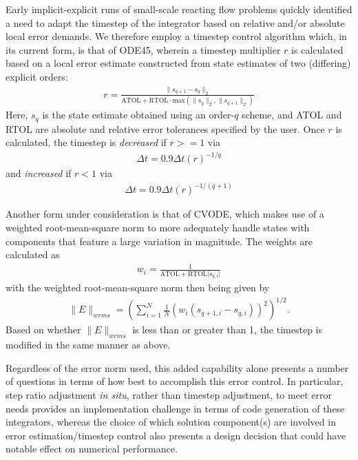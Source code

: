 Early implicit-explicit runs of small-scale reacting flow problems
quickly identified a need to adapt the timestep of the integrator based
on relative and/or absolute local error demands. We therefore employ a
timestep control algorithm which, in its current form, is that of ODE45, wherein
a timestep multiplier $r$ is calculated based on a local error estimate constructed from
state estimates of two (differing) explicit orders:
\begin{align}
r = \frac{\|s_{q+1} - s_{q}\|_{2}}{\text{ATOL} + \text{RTOL} \cdot \text{max}(\|s_{q}\|_{2}, \|s_{q+1}\|_{2})}
\end{align}
Here, $s_{q}$ is the state estimate obtained using an order-$q$ scheme, and ATOL and RTOL are absolute and
relative error tolerances specified by the user. Once $r$ is calculated, the timestep is \emph{decreased} if
$r>=1$ via
\begin{align}
\Delta t = 0.9\Delta t (r)^{-1/q}
\end{align}
and \emph{increased} if $r<1$ via
\begin{align}
\Delta t = 0.9\Delta t (r)^{-1/(q+1)}
\end{align}

Another form under consideration is that of CVODE, which makes use of a weighted
root-mean-square norm to more adequately handle states with components that
feature a large variation in magnitude. The weights are calculated as
\begin{align}
w_{i} = \frac{1}{\text{ATOL} + \text{RTOL} \lvert s_{q,i} \rvert}
\end{align}
with the weighted root-mean-square norm then being given by
\begin{align}
\|E\|_{wrms} = \left(\sum_{i=1}^{N} \frac{1}{N} (w_{i}(s_{q+1,i} - s_{q,i}))^2 \right)^{1/2}.
\end{align}
Based on whether $\|E\|_{wrms}$ is less than or greater than 1, the timestep
is modified in the same manner as above.

Regardless of the error norm used, this added capability alone presents a number of
questions in terms of how best to accomplish this error control. In particular,
step ratio adjustment \emph{in situ}, rather than timestep adjustment, to meet error
needs provides an implementation challenge in terms of code generation of these
integrators, whereas the choice of which solution component(s) are involved in error
estimation/timestep control also presents a design decision that could have notable
effect on numerical performance.

